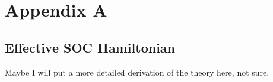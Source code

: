 \section{Appendix A}


\subsection{Effective SOC Hamiltonian}	

Maybe I will put a more detailed derivation of the theory here, not sure.


%
%
%

	

 
